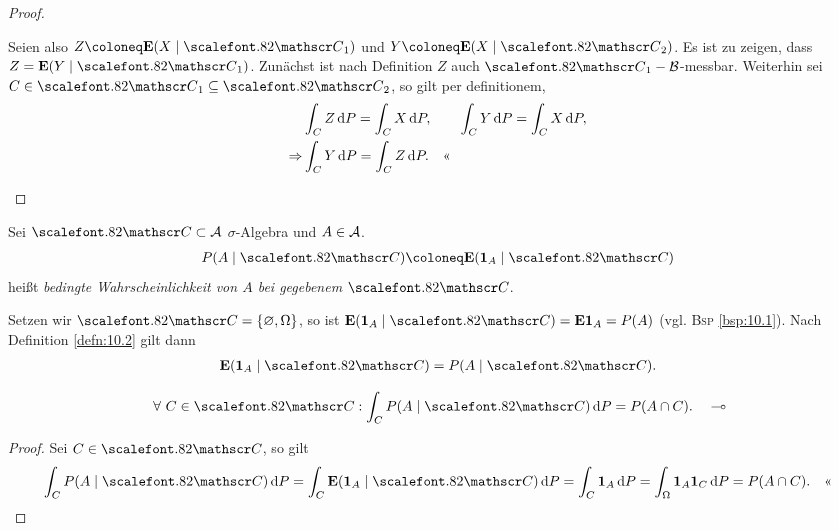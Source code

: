 \begin{proof}
\begin{proofenum}
\begin{enumerate}[leftmargin=16pt]
Seien also $Z\defl\E(X\mid\CC_1)$ und $Y\defl\E(X\mid\CC_2)$. Es ist zu zeigen, dass
$Z=\E(Y\mid\CC_1)$. Zunächst ist nach Definition $Z$ auch
$\CC_1-\BB$-messbar. Weiterhin sei $C\in\CC_1\subseteq \CC_2$, so gilt per
definitionem,
\begin{align*}
&\int_C Z \dP = \int_C X\dP,\qquad \int_C Y \dP = \int_ C X\dP,\\
\Rightarrow & \int_C Y \dP = \int_C Z\dP.\qedhere  
\end{align*}
\end{enumerate}
\end{proofenum}
\end{proof}

\begin{defn}
\label{defn:10.2}
Sei ${\CC}\subset {\AA}$ $\sigma$-Algebra und $A\in {\AA}$.
\begin{align*}
P(A\mid {\CC})\defl \E(\Id _{A}\mid {\CC})
\end{align*}
heißt \emph{bedingte Wahrscheinlichkeit von $A$ bei gegebenem
${\CC}$}.\fishhere
\end{defn}

Setzen wir $\CC=\setd{\varnothing,\Omega}$, so ist $\E(\Id_A\mid\CC) = \E
\Id_A = P(A)$ (vgl. \textsc{Bsp} \ref{bsp:10.1}). Nach Definition
\ref{defn:10.2} gilt dann
\begin{align*}
\E(\Id_A\mid\CC) = P(A\mid\CC).
\end{align*}

\begin{bem}
\label{bem:10.1}
\begin{align*}
\forall{C\in {\CC}} : \int_{C} P(A\mid {\CC})\dP =P(A\cap C).\maphere
\end{align*}
\end{bem}
\begin{proof}
Sei $C\in\CC$, so gilt
\begin{align*}
\int_{C} P(A\mid {\CC})\dP = \int_{C} \E(\Id_A\mid \CC)\dP
= \int_{C} \Id_A\dP=\int_{\Omega} \Id_A\Id_C\dP = P(A\cap C).\qedhere
\end{align*}
\end{proof}

